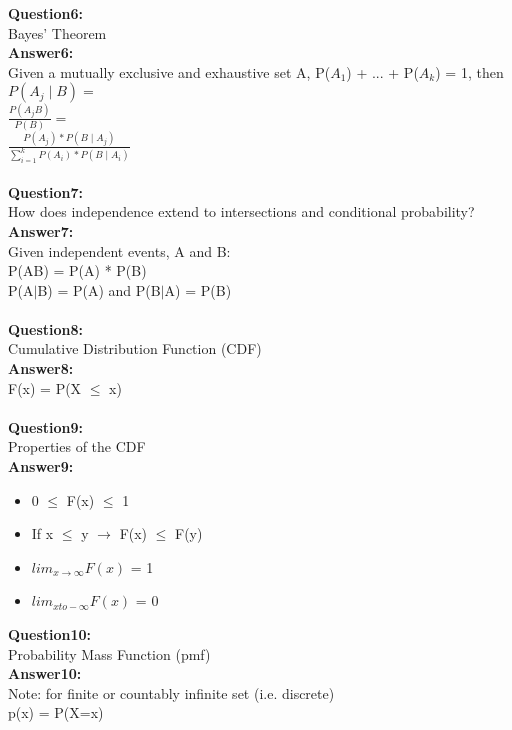 \documentclass{article}
\begin{document}
\textbf{Question6:} \\
Bayes' Theorem 
\\
\textbf{Answer6:} \\
Given a mutually exclusive and exhaustive set A, P($A_1$) + ... + P($A_k$) = 1, then\\
$P(A_j \mid B) = $\\
$\frac{P(A_jB)}{P(B)} = $\\
$\frac{P(A_j) * P(B \mid A_j)}{\sum_{i=1}^k P(A_i) * P(B \mid A_i)}$
\\\\


\textbf{Question7:} \\
How does independence extend to intersections and conditional probability?
\\
\textbf{Answer7:} \\
Given independent events, A and B:\\
P(AB) = P(A) * P(B)\\
P(A$\mid$B) = P(A) and P(B$\mid$A) = P(B)
\\\\


\textbf{Question8:} \\
Cumulative Distribution Function (CDF)
\\
\textbf{Answer8:} \\
F(x) = P(X $\leq$ x)
\\\\


\textbf{Question9:} \\
Properties of the CDF
\\
\textbf{Answer9:} \\
\begin{itemize}
	\item 0 $\leq$ F(x) $\leq$ 1
	\item If x $\leq$ y $\rightarrow$ F(x) $\leq$ F(y)
	\item $lim_ {x \to \infty} F (x)$ = 1
	\item $lim_ {x to -\infty} F (x)$ = 0
\end{itemize}


\textbf{Question10:} \\
Probability Mass Function (pmf)
\\
\textbf{Answer10:} \\
Note: for finite or countably infinite set (i.e. discrete)\\
p(x) = P(X=x)
\\\\
\end{document}
